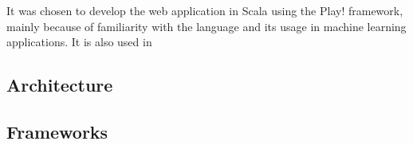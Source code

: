 It was chosen to develop the web application in Scala using the Play! framework, mainly because of familiarity with the language and its usage in machine learning applications. It is also used in  

\subsection{Architecture}\label{sec:architecture}


\subsection{Frameworks}\label{sec:frameworks}

